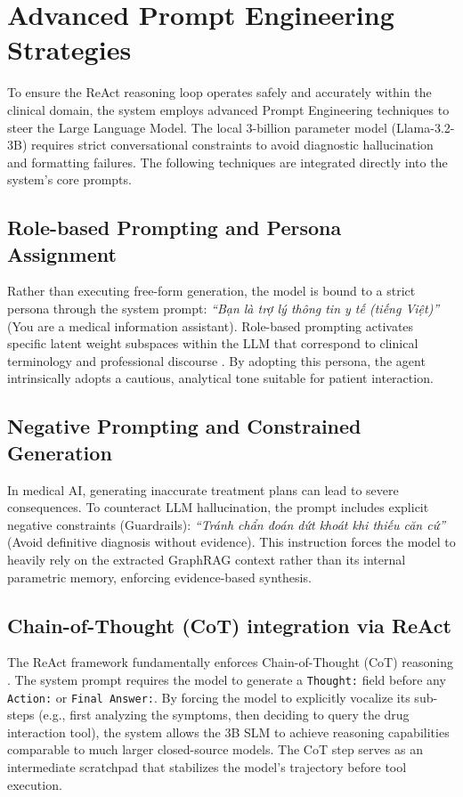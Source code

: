 \documentclass[../main.tex]{subfiles}
\begin{document}
\section{Advanced Prompt Engineering Strategies}
\label{section:3.4}

To ensure the ReAct reasoning loop operates safely and accurately within the clinical domain, the system employs advanced Prompt Engineering techniques to steer the Large Language Model. The local $3$-billion parameter model (Llama-3.2-3B) requires strict conversational constraints to avoid diagnostic hallucination and formatting failures. The following techniques are integrated directly into the system's core prompts.

\subsection{Role-based Prompting and Persona Assignment}
Rather than executing free-form generation, the model is bound to a strict persona through the system prompt: \textit{``Bạn là trợ lý thông tin y tế (tiếng Việt)''} (You are a medical information assistant). Role-based prompting activates specific latent weight subspaces within the LLM that correspond to clinical terminology and professional discourse \cite{reynolds2021prompt}. By adopting this persona, the agent intrinsically adopts a cautious, analytical tone suitable for patient interaction.

\subsection{Negative Prompting and Constrained Generation}
In medical AI, generating inaccurate treatment plans can lead to severe consequences. To counteract LLM hallucination, the prompt includes explicit negative constraints (Guardrails): \textit{``Tránh chẩn đoán dứt khoát khi thiếu căn cứ''} (Avoid definitive diagnosis without evidence). This instruction forces the model to heavily rely on the extracted GraphRAG context rather than its internal parametric memory, enforcing evidence-based synthesis.

\subsection{Chain-of-Thought (CoT) integration via ReAct}
The ReAct framework fundamentally enforces Chain-of-Thought (CoT) reasoning \cite{wei2022chain}. The system prompt requires the model to generate a \texttt{Thought:} field before any \texttt{Action:} or \texttt{Final Answer:}. By forcing the model to explicitly vocalize its sub-steps (e.g., first analyzing the symptoms, then deciding to query the drug interaction tool), the system allows the $3$B SLM to achieve reasoning capabilities comparable to much larger closed-source models. The CoT step serves as an intermediate scratchpad that stabilizes the model's trajectory before tool execution.
\end{document}
